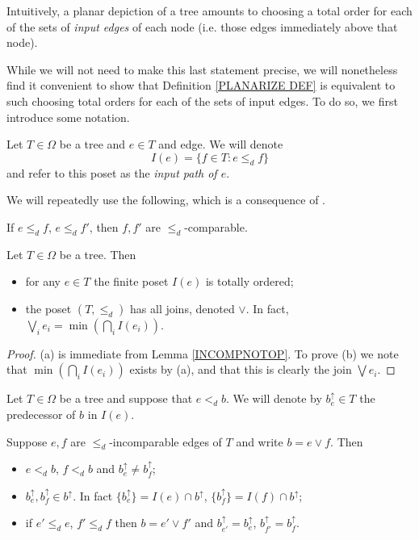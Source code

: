 \documentclass[a4paper,10pt]{article}%
\begin{document}
Intuitively, a planar depiction of a tree amounts to choosing a total order for each of the sets of \textit{input edges} of each node (i.e. those edges immediately above that node).

While we will not need to make this last statement precise, we will nonetheless find it convenient to show that Definition \ref{PLANARIZE DEF} is equivalent to such choosing total orders for each of the sets of input edges.
To do so, we first introduce some notation.


\begin{notation}\label{INPUTPATH NOT}
	Let $T \in \Omega$ be a tree and $e \in T$ and edge. We will denote
	\[ I(e) =\{f \in T \colon e \leq_d f \} \]
and refer to this poset as the \textit{input path of $e$}.
\end{notation}

We will repeatedly use the following, which is a consequence of \cite[Cor. 5.26]{Pe16b}.

\begin{lemma}\label{INCOMPNOTOP}
If $e \leq_d f$, $e \leq_d f'$, then $f,f'$ are $\leq_d$-comparable. 
\end{lemma} 

\begin{proposition}\label{INPUTPATHS PROP}
	Let $T \in \Omega$ be a tree. Then
	\begin{itemize}
		\item[(a)] for any $e \in T$ the finite poset $I(e)$ is totally ordered;
		\item[(b)] the poset $(T,\leq_d)$ has all joins, denoted $\vee$. In fact, $\bigvee_{i} e_i = \min (\bigcap_{i} I(e_i))$.
	\end{itemize}
\end{proposition}

\begin{proof}
	(a) is immediate from Lemma \ref{INCOMPNOTOP}.
To prove (b) we note that 
	$\min (\bigcap_{i} I(e_i))$ exists by (a), and that this is clearly the join $\bigvee{e_i}$.
\end{proof}


\begin{notation}
	Let $T \in \Omega$ be a tree and suppose that $e <_d b$. We will denote by $b^{\uparrow}_e \in T$ the predecessor of $b$ in $I(e)$.
\end{notation}


\begin{proposition}\label{INPUTPREDECESSORPROP PROP}
Suppose $e,f$ are $\leq_d$-incomparable edges of $T$ and write $b= e \vee f$. Then
\begin{itemize}
\item [(a)] $e <_d b$, $f<_d b$ and $b^{\uparrow}_e \neq b^{\uparrow}_f$;
\item [(b)] $b^{\uparrow}_e, b^{\uparrow}_f \in b^{\uparrow}$. In fact $\{b^{\uparrow}_e\} = I(e) \cap b^{\uparrow}$,
$\{b^{\uparrow}_f\} = I(f) \cap b^{\uparrow}$;
\item[(c)] if $e' \leq_d e$, $f' \leq_d f$ then 
$b = e' \vee f'$ and $b^{\uparrow}_{e'} = b^{\uparrow}_{e}$, $b^{\uparrow}_{f'} = b^{\uparrow}_{f}$.
\end{itemize}
\end{proposition}
\end{document}
